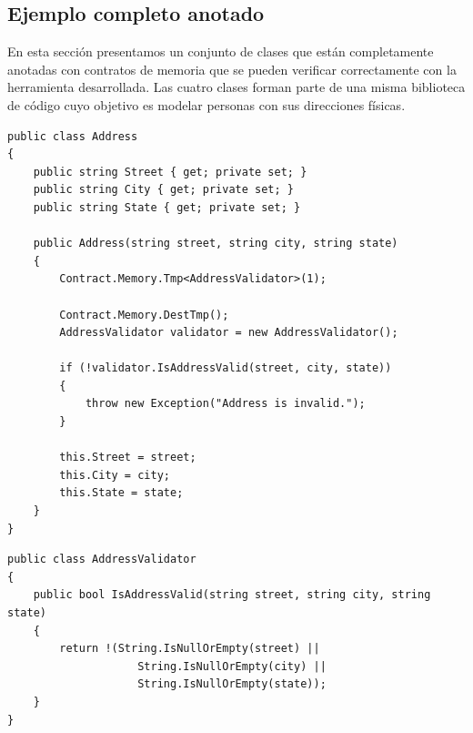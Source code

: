 \documentclass[12pt,a4paper]{article}
\begin{document}
		\newpage
		\subsection{Ejemplo completo anotado} \label{sec:ejcompanot}
			En esta sección presentamos un conjunto de clases que están completamente anotadas con contratos de memoria que se pueden verificar correctamente con la herramienta desarrollada. Las cuatro clases forman parte de una misma biblioteca de código cuyo objetivo es modelar personas con sus direcciones físicas.

			\vspace{15pt}
			\begin{footnotesize}
			\begin{lstlisting}[caption=Clase Address]
public class Address
{
	public string Street { get; private set; }
	public string City { get; private set; }
	public string State { get; private set; }
	
	public Address(string street, string city, string state)
	{
		Contract.Memory.Tmp<AddressValidator>(1);

		Contract.Memory.DestTmp();
		AddressValidator validator = new AddressValidator();

		if (!validator.IsAddressValid(street, city, state))
		{
			throw new Exception("Address is invalid.");
		}

		this.Street = street;
		this.City = city;
		this.State = state;
	}
}
			\end{lstlisting}
			\end{footnotesize}

			\begin{footnotesize}
			\begin{lstlisting}[caption=Clase AddressValidator]
public class AddressValidator
{
	public bool IsAddressValid(string street, string city, string state)
	{
		return !(String.IsNullOrEmpty(street) ||
					String.IsNullOrEmpty(city) ||
					String.IsNullOrEmpty(state));
	}
}
			\end{lstlisting}
			\end{footnotesize}
\end{document}
